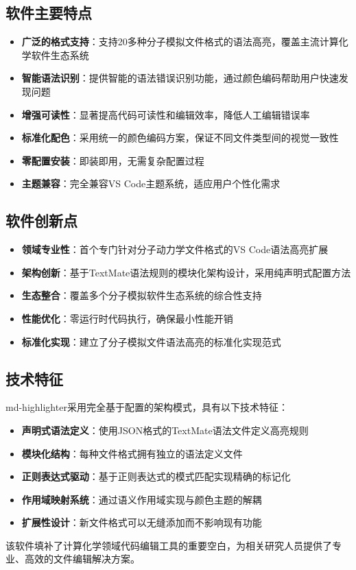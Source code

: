 \subsection{软件主要特点}

\begin{itemize}
    \item \textbf{广泛的格式支持}：支持20多种分子模拟文件格式的语法高亮，覆盖主流计算化学软件生态系统
    \item \textbf{智能语法识别}：提供智能的语法错误识别功能，通过颜色编码帮助用户快速发现问题
    \item \textbf{增强可读性}：显著提高代码可读性和编辑效率，降低人工编辑错误率
    \item \textbf{标准化配色}：采用统一的颜色编码方案，保证不同文件类型间的视觉一致性
    \item \textbf{零配置安装}：即装即用，无需复杂配置过程
    \item \textbf{主题兼容}：完全兼容VS Code主题系统，适应用户个性化需求
\end{itemize}

\subsection{软件创新点}

\begin{itemize}
    \item \textbf{领域专业性}：首个专门针对分子动力学文件格式的VS Code语法高亮扩展
    \item \textbf{架构创新}：基于TextMate语法规则的模块化架构设计，采用纯声明式配置方法
    \item \textbf{生态整合}：覆盖多个分子模拟软件生态系统的综合性支持
    \item \textbf{性能优化}：零运行时代码执行，确保最小性能开销
    \item \textbf{标准化实现}：建立了分子模拟文件语法高亮的标准化实现范式
\end{itemize}

\subsection{技术特征}

md-highlighter采用完全基于配置的架构模式，具有以下技术特征：

\begin{itemize}
    \item \textbf{声明式语法定义}：使用JSON格式的TextMate语法文件定义高亮规则
    \item \textbf{模块化结构}：每种文件格式拥有独立的语法定义文件
    \item \textbf{正则表达式驱动}：基于正则表达式的模式匹配实现精确的标记化
    \item \textbf{作用域映射系统}：通过语义作用域实现与颜色主题的解耦
    \item \textbf{扩展性设计}：新文件格式可以无缝添加而不影响现有功能
\end{itemize}

该软件填补了计算化学领域代码编辑工具的重要空白，为相关研究人员提供了专业、高效的文件编辑解决方案。